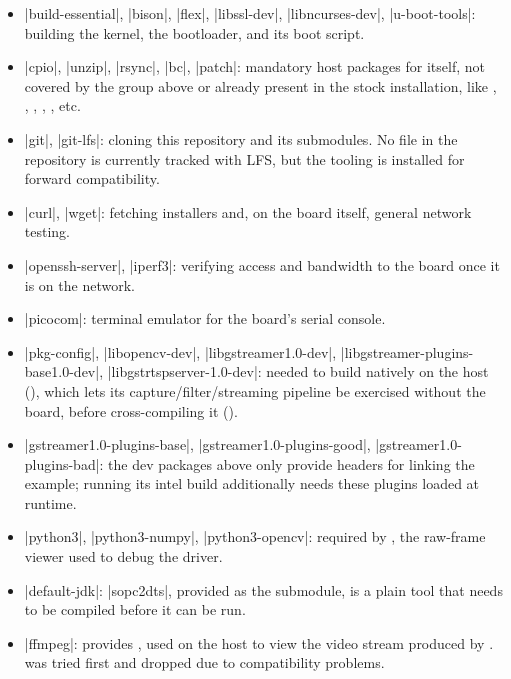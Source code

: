 \begin{itemize}
    \item |build-essential|, |bison|, |flex|, |libssl-dev|, |libncurses-dev|, |u-boot-tools|: building the  kernel, the  bootloader, and its boot script.
    \item |cpio|, |unzip|, |rsync|, |bc|, |patch|: mandatory host packages for  itself, not covered by the group above or already present in the stock  installation, like , , , , , etc.
    \item |git|, |git-lfs|: cloning this repository and its submodules. No file in the repository is currently tracked with LFS, but the tooling is installed for forward compatibility.
    \item |curl|, |wget|: fetching installers and, on the board itself, general network testing.
    \item |openssh-server|, |iperf3|: verifying  access and bandwidth to the board once it is on the network.
    \item |picocom|: terminal emulator for the board's serial console.
    \item |pkg-config|, |libopencv-dev|, |libgstreamer1.0-dev|, |libgstreamer-plugins-base1.0-dev|, |libgstrtspserver-1.0-dev|: needed to build  natively on the host (), which lets its capture/filter/streaming pipeline be exercised without the board, before cross-compiling it ().
    \item |gstreamer1.0-plugins-base|, |gstreamer1.0-plugins-good|, |gstreamer1.0-plugins-bad|: the dev packages above only provide headers for linking the  example; running its intel build additionally needs these plugins loaded at runtime.
    \item |python3|, |python3-numpy|, |python3-opencv|: required by , the raw-frame viewer used to debug the  driver.
    \item |default-jdk|: |sopc2dts|, provided as the  submodule, is a plain  tool that needs to be compiled before it can be run.
    \item |ffmpeg|: provides , used on the host to view the  video stream produced by .  was tried first and dropped due to compatibility problems.
\end{itemize}

